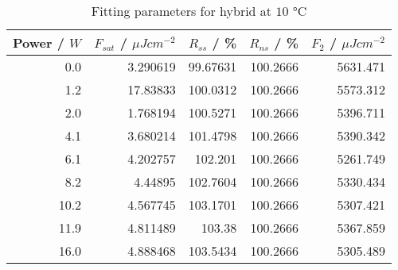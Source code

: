 \begin{table}[H]
\caption{Fitting parameters for hybrid at $10$ °C}
\begin{tabular}{rrrrr}
\toprule
Power / $W$ & $F_{sat}$ / $\mu Jcm^{-2}$ & $R_{ss}$ / \% & $R_{ns}$ / \% & $F_2$ / $\mu Jcm^{-2}$ \\
\midrule
0.0 & 3.290619 & 99.67631 & 100.2666 & 5631.471 \\
1.2 & 17.83833 & 100.0312 & 100.2666 & 5573.312 \\
2.0 & 1.768194 & 100.5271 & 100.2666 & 5396.711 \\
4.1 & 3.680214 & 101.4798 & 100.2666 & 5390.342 \\
6.1 & 4.202757 & 102.201 & 100.2666 & 5261.749 \\
8.2 & 4.44895 & 102.7604 & 100.2666 & 5330.434 \\
10.2 & 4.567745 & 103.1701 & 100.2666 & 5307.421 \\
11.9 & 4.811489 & 103.38 & 100.2666 & 5367.859 \\
16.0 & 4.888468 & 103.5434 & 100.2666 & 5305.489 \\
\bottomrule
\end{tabular}
\end{table}
